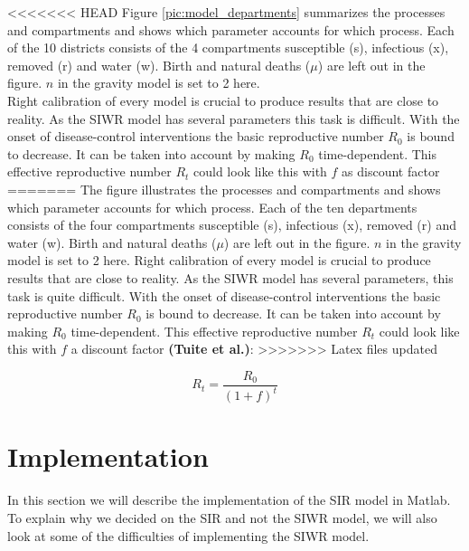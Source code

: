 \documentclass[11pt]{article}
\begin{document}
<<<<<<< HEAD
Figure \ref{pic:model_departments} summarizes the processes and compartments and shows which parameter accounts for which process. Each of the 10 districts consists of the 4 compartments susceptible (s), infectious (x), removed (r) and water (w). Birth and natural deaths ($ \mu $) are left out in the figure. $ n $ in the gravity model is set to 2 here.\\
Right calibration of every model is crucial to produce results that are close to reality. As the SIWR model has several parameters this task is difficult. With the onset of disease-control interventions the basic reproductive number $ R_{0} $ is bound to decrease. It can be taken into account by making $ R_{0} $ time-dependent. This effective reproductive number $ R_{t} $ could look like this with $ f $ as discount factor\cite{tuite:2011}
=======
The figure illustrates the processes and compartments and shows which parameter accounts for which process. Each of the ten departments consists of the four compartments susceptible (s), infectious (x), removed (r) and water (w). Birth and natural deaths ($ \mu $) are left out in the figure. $ n $ in the gravity model is set to 2 here. Right calibration of every model is crucial to produce results that are close to reality. As the SIWR model has several parameters, this task is quite difficult. With the onset of disease-control interventions the basic reproductive number $ R_{0} $ is bound to decrease. It can be taken into account by making $ R_{0} $ time-dependent. This effective reproductive number $ R_{t} $ could look like this with $ f $ a discount factor \textbf{(Tuite et al.)}:
>>>>>>> Latex files updated

\begin{equation}
R_{t}=\dfrac{R_{0}}{(1+f)^{t}}
\label{eq:rep_number}
\end{equation}










\section{Implementation}
In this section we will describe the implementation of the SIR model in Matlab. To explain why we decided on the SIR and not the SIWR model, we will also look at some of the difficulties of implementing the SIWR model.
\end{document}
